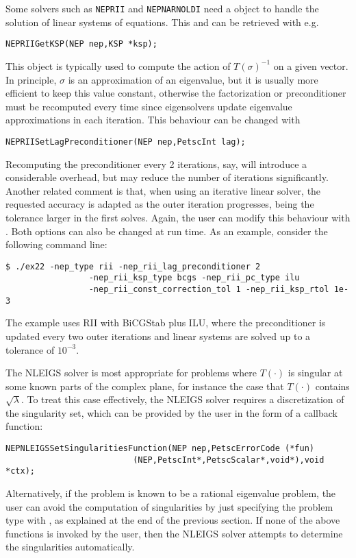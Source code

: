 Some solvers such as \texttt{NEPRII} and \texttt{NEPNARNOLDI} need a  object to handle the solution of linear systems of equations. This  and can be retrieved with e.g.
	\begin{Verbatim}[fontsize=\small]
	NEPRIIGetKSP(NEP nep,KSP *ksp);
	\end{Verbatim}

This  object is typically used to compute the action of $T(\sigma)^{-1}$ on a given vector. In principle, $\sigma$ is an approximation of an eigenvalue, but it is usually more efficient to keep this value constant, otherwise the factorization or preconditioner must be recomputed every time since eigensolvers update eigenvalue approximations in each iteration. This behaviour can be changed with
	\begin{Verbatim}[fontsize=\small]
	NEPRIISetLagPreconditioner(NEP nep,PetscInt lag);
	\end{Verbatim}
Recomputing the preconditioner every 2 iterations, say, will introduce a considerable overhead, but may reduce the number of iterations significantly. Another related comment is that, when using an iterative linear solver, the requested accuracy is adapted as the outer iteration progresses, being the tolerance larger in the first solves. Again, the user can modify this behaviour with . Both options can also be changed at run time. As an example, consider the following command line:
\begin{Verbatim}[fontsize=\small]
	$ ./ex22 -nep_type rii -nep_rii_lag_preconditioner 2
                 -nep_rii_ksp_type bcgs -nep_rii_pc_type ilu
                 -nep_rii_const_correction_tol 1 -nep_rii_ksp_rtol 1e-3
\end{Verbatim}
The example uses RII with BiCGStab plus ILU, where the preconditioner is updated every two outer iterations and linear systems are solved up to a tolerance of $10^{-3}$.

The NLEIGS solver is most appropriate for problems where $T(\cdot)$ is singular at some known parts of the complex plane, for instance the case that $T(\cdot)$ contains $\sqrt{\lambda}$. To treat this case effectively, the NLEIGS solver requires a discretization of the singularity set, which can be provided by the user in the form of a callback function:
	\begin{Verbatim}[fontsize=\small]
        NEPNLEIGSSetSingularitiesFunction(NEP nep,PetscErrorCode (*fun)
                          (NEP,PetscInt*,PetscScalar*,void*),void *ctx);
	\end{Verbatim}
Alternatively, if the problem is known to be a rational eigenvalue problem, the user can avoid the computation of singularities by just specifying the problem type with , as explained at the end of the previous section.
If none of the above functions is invoked by the user, then the NLEIGS solver attempts to determine the singularities automatically.


